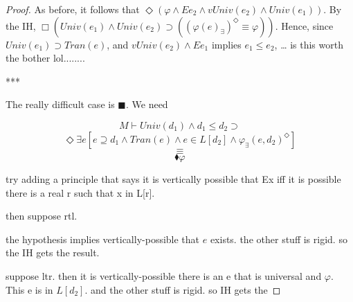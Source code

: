 \documentclass{article}
\newcommand\D{\blacklozenge}
\newcommand\B{\blacksquare}
\begin{document}
\begin{proof}
        As before, it follows that $\Diamond (\varphi \wedge Ee_2 \wedge vUniv(e_2) \wedge Univ(e_1))$. By the IH, 
        $\Box (Univ(e_1) \wedge Univ(e_2) \supset ((\varphi(e)_\exists)^\Diamond \equiv \varphi))$. Hence,
        since $Univ(e_1) \supset Tran(e)$, and $vUniv(e_2) \wedge Ee_1$ implies $e_1 \leq e_2$, \dots
        is this worth the bother lol........
    
        ***

        The really difficult case is $\B$. We need
    
        $$M \vdash Univ(d_1) \wedge d_1 \leq d_2 \supset $$
        $$\Diamond \exists e[e \supseteq d_1 \wedge Tran(e) \wedge e \in L[d_2] \wedge \varphi_\exists(e, d_2)^\Diamond]$$
        $$\equiv $$
        $$\D \varphi$$


        try adding a principle that says it is vertically possible that 
        Ex iff it is possible there is a real r such that x in L[r].

        then suppose rtl. 

        the hypothesis implies vertically-possible that $e$ exists. the other stuff 
        is rigid. so the IH gets the result.

        suppose ltr. then it is vertically-possible there 
        is an e that is universal and $\varphi$. This e is in $L[d_2]$.
        and the other stuff is rigid. so IH gets the

    \end{proof}
    
\end{document}
